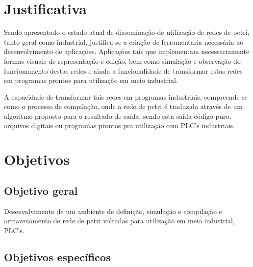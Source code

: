 \section{Justificativa}

Sendo apresentado o estado atual de disseminação de utilização de redes de petri, tanto geral como industrial, justifica-se a criação de ferramentaria necessária ao desenvolvimento de aplicações. Aplicações tais que implementam necessariamente formas visuais de representação e edição, bem como simulação e observação do funcionamento destas redes e ainda a funcionalidade de transformar estas redes em programas prontos para utilização em meio industrial.

A capacidade de transformar tais redes em programas industriais, compreende-se como o processo de compilação, onde a rede de petri é traduzida através de um algoritmo proposto para o resultado de saída, sendo esta saída código puro, arquivos digitais ou programas prontos pra utilização com PLC's industriais.

\section{Objetivos}

\subsection{Objetivo geral}

Desenvolvimento de um ambiente de definição, simulação e compilação e armazenamento de rede de petri voltadas para utilização em meio industrial, PLC's.

\subsection{Objetivos específicos}

